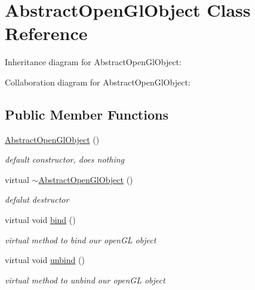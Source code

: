 \hypertarget{class_abstract_open_gl_object}{\section{Abstract\-Open\-Gl\-Object Class Reference}
\label{class_abstract_open_gl_object}
}


Inheritance diagram for Abstract\-Open\-Gl\-Object\-:


Collaboration diagram for Abstract\-Open\-Gl\-Object\-:
\subsection*{Public Member Functions}
\begin{DoxyCompactItemize}
\item 
\hypertarget{class_abstract_open_gl_object_a96af8fad4e89a9ea75c535748ffa82a5}{\hyperlink{class_abstract_open_gl_object_a96af8fad4e89a9ea75c535748ffa82a5}{Abstract\-Open\-Gl\-Object} ()}\label{class_abstract_open_gl_object_a96af8fad4e89a9ea75c535748ffa82a5}

\begin{DoxyCompactList}\small\item\em default constructor, does nothing \end{DoxyCompactList}\item 
\hypertarget{class_abstract_open_gl_object_ac48ade8b59e497ef45e9238327f93873}{virtual \hyperlink{class_abstract_open_gl_object_ac48ade8b59e497ef45e9238327f93873}{$\sim$\-Abstract\-Open\-Gl\-Object} ()}\label{class_abstract_open_gl_object_ac48ade8b59e497ef45e9238327f93873}

\begin{DoxyCompactList}\small\item\em defalut destructor \end{DoxyCompactList}\item 
\hypertarget{class_abstract_open_gl_object_ad177ced7b2eee2b6d80faa8f5409517b}{virtual void \hyperlink{class_abstract_open_gl_object_ad177ced7b2eee2b6d80faa8f5409517b}{bind} ()}\label{class_abstract_open_gl_object_ad177ced7b2eee2b6d80faa8f5409517b}

\begin{DoxyCompactList}\small\item\em virtual method to bind our open\-G\-L object \end{DoxyCompactList}\item 
\hypertarget{class_abstract_open_gl_object_aa345bb3bc9d0e27521462fd3cfa93a69}{virtual void \hyperlink{class_abstract_open_gl_object_aa345bb3bc9d0e27521462fd3cfa93a69}{unbind} ()}\label{class_abstract_open_gl_object_aa345bb3bc9d0e27521462fd3cfa93a69}

\begin{DoxyCompactList}\small\item\em virtual method to unbind our open\-G\-L object \end{DoxyCompactList}\end{DoxyCompactItemize}
